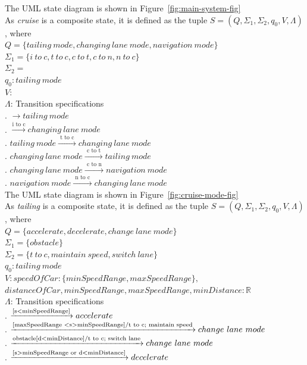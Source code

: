 \documentclass[12pt]{article}
\begin{document}
\begin{spacing}{1.5}
\noindent The UML state diagram is shown in Figure~\ref{fig:main-system-fig}\\


\noindent As \textit{cruise} is a composite state, it is defined as the tuple $S = (Q, \Sigma_1, \Sigma_2, q_0, V, \Lambda)$, where\\

\noindent $Q = \{tailing~mode, changing~lane~mode, navigation~mode\}$\\
\noindent $\Sigma_1 = \{i~to~c, t~to~c, c~to~t, c~to~n, n~to~c\}$\\
\noindent $\Sigma_2 = $\\
\noindent $q_0: tailing~mode$\\
\noindent $V: $\\
\noindent $\Lambda$: Transition specifications\\
. $\rightarrow tailing~mode$\\
. $\xrightarrow {\text{i to c}} changing~lane~mode$\\
. $tailing~mode \xrightarrow {\text { t to c }} changing~lane~mode$\\
. $changing~lane~mode \xrightarrow {\text { c to t }} tailing~mode$\\
. $changing~lane~mode \xrightarrow {\text { c to n }} navigation~mode$\\
. $navigation~mode \xrightarrow {\text { n to c }} changing~lane~mode$\\

\noindent The UML state diagram is shown in Figure~\ref{fig:cruise-mode-fig}\\


\noindent As \textit{tailing} is a composite state, it is defined as the tuple $S = (Q, \Sigma_1, \Sigma_2, q_0, V, \Lambda)$, where\\

\noindent $Q = \{accelerate, decelerate, change~lane~mode\}$\\
\noindent $\Sigma_1 = \{obstacle\}$\\
\noindent $\Sigma_2 = \{t~to~c, maintain~speed, switch~lane\}$\\
\noindent $q_0: tailing~mode$\\
\noindent $V: speedOfCar : \{minSpeedRange, maxSpeedRange\},$\\
\indent $distanceOfCar, minSpeedRange, maxSpeedRange, minDistance: \mathbb{R} $\\
\noindent $\Lambda$: Transition specifications\\
. $\xrightarrow {\text{[s\textless minSpeedRange]}} accelerate$\\
. $\xrightarrow {\text{[maxSpeedRange \textless s\textgreater minSpeedRange]/t to c; maintain speed}} change~lane~mode$\\
. $\xrightarrow {\text{obstacle[d\textless minDistance]/t to c; switch lane}} change~lane~mode$\\
. $\xrightarrow {\text{[s\textgreater minSpeedRange or d\textless minDistance]}} decelerate$\\


\end{spacing}
\end{document}
